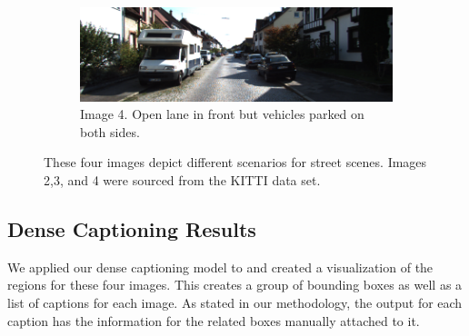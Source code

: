\begin{figure}[ht]
\begin{subfigure}{.5\textwidth}
  \label{fig:sub-third}
\end{subfigure}
\begin{subfigure}{.5\textwidth}
  \centering
  \includegraphics[width=.8\linewidth]{uu_000012.png}  
  \caption{Image 4. Open lane in front but vehicles parked on both sides.}
  \label{fig:sub-fourth}
\end{subfigure}
\caption{These four images depict different scenarios for street scenes. Images 2,3, and 4 were sourced from the KITTI data set.  }
\label{fig:fig}
\end{figure}

\subsection{Dense Captioning Results}
We applied our dense captioning model to and created a visualization of the regions for these four images. This creates a group of bounding boxes as well as a list of captions for each image. As stated in our methodology, the output for each caption has the information for the related boxes manually attached to it.

